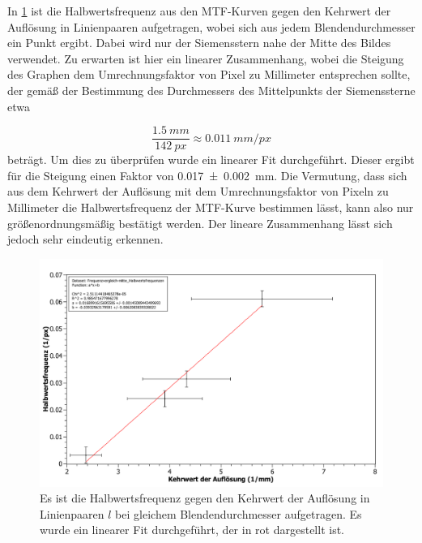 \documentclass[
	a4paper,
	12pt,
	pagesize,
	ngerman
]{scrartcl}
\begin{document}
	In \cref{fig_einzel_vgl} ist die Halbwertsfrequenz aus den MTF-Kurven gegen den Kehrwert der Auflösung in Linienpaaren aufgetragen, wobei sich aus jedem Blendendurchmesser ein Punkt ergibt.
	Dabei wird nur der Siemensstern nahe der Mitte des Bildes verwendet.
	Zu erwarten ist hier ein linearer Zusammenhang, wobei die Steigung des Graphen dem Umrechnungsfaktor von Pixel zu Millimeter entsprechen sollte, der gemäß der Bestimmung des Durchmessers des Mittelpunkts der Siemenssterne etwa
	
	\begin{equation*}
		 \frac{\SI{1,5}{mm}}{\SI{142}{px}} \approx \SI{0,011}{mm/px} %
	\end{equation*}
	beträgt.
	Um dies zu überprüfen wurde ein linearer Fit durchgeführt.
	Dieser ergibt für die Steigung einen Faktor von \SI{0,017\pm 0,002}{mm}.
	Die Vermutung, dass sich aus dem Kehrwert der Auflösung mit dem Umrechnungsfaktor von Pixeln zu Millimeter die Halbwertsfrequenz der MTF-Kurve bestimmen lässt, kann also nur größenordnungsmäßig bestätigt werden.
	Der lineare Zusammenhang lässt sich jedoch sehr eindeutig erkennen.
	
	\begin{figure}[H]  
		\includegraphics[width=1\textwidth]{fig_Einzellinse_Vergleich}
		\centering
		\caption{
			Es ist die Halbwertsfrequenz gegen den Kehrwert der Auflösung in Linienpaaren $l$ bei gleichem Blendendurchmesser aufgetragen.
			Es wurde ein linearer Fit durchgeführt, der in rot dargestellt ist.
		}
		\label{fig_einzel_vgl}
		\centering
	\end{figure}
	
	
\end{document}
